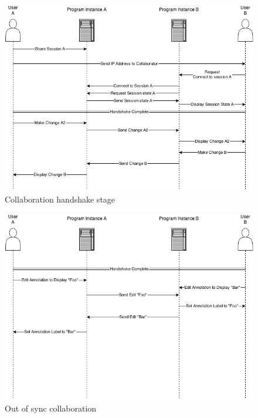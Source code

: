 \begin{figure}[h!]
    \centering
    \includegraphics[width=\textwidth]{images/minf_collab_diagram.png}
    \caption{Collaboration handshake stage}
    \label{fig:collab_handshake}
\end{figure}

\begin{figure}[h!]
    \centering
    \includegraphics[width=\textwidth]{images/minf_collab_mixup.png}
    \caption{Out of sync collaboration}
    \label{fig:collab_mixup}
\end{figure}

